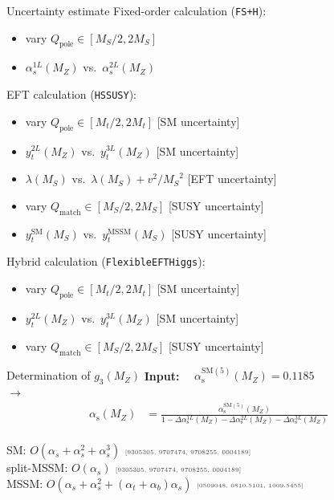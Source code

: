 \documentclass[hyperref={pdfpagelabels=false},ngerman]{beamer}
\newcommand{\MS}{\ensuremath{M_S}}
\newcommand{\mycite}[1]{\ensuremath{\text{\textcolor{darkgray}{\tiny [#1]}}}}
\renewcommand{\emph}{\textbf}
\newcommand{\SM}{\ensuremath{\text{SM}}}
\newcommand{\MSSM}{\ensuremath{\text{MSSM}}}
\newcommand{\pole}{\ensuremath{\text{pole}}}
\newcommand{\match}{\ensuremath{\text{match}}}
\newcommand{\at}{\alpha_t}
\newcommand{\ab}{\alpha_b}
\newcommand{\as}{\alpha_s}
\begin{document}
\begin{frame}[noframenumbering]{Uncertainty estimate}
  Fixed-order calculation (\texttt{FS+H}):
  \begin{itemize}
  \item vary $Q_\pole \in [\MS/2, 2\MS]$
  \item $\alpha^{1L}_s(M_Z)$ vs.\ $\alpha^{2L}_s(M_Z)$
  \end{itemize}
  EFT calculation (\texttt{HSSUSY}):
  \begin{itemize}
  \item vary $Q_\pole \in [M_t/2, 2 M_t]$ \hfill [SM uncertainty]
  \item $y_t^{2L}(M_Z)$ vs.\ $y_t^{3L}(M_Z)$ \hfill [SM uncertainty]
  \item $\lambda(\MS)$ vs.\ $\lambda(\MS) + v^2/\MS^2$ \hfill [EFT uncertainty]
  \item vary $Q_\match \in [\MS/2, 2 \MS]$ \hfill [SUSY uncertainty]
  \item $y_t^{\SM}(\MS)$ vs.\ $y_t^{\MSSM}(\MS)$ \hfill [SUSY uncertainty]
  \end{itemize}
  Hybrid calculation (\texttt{FlexibleEFTHiggs}):
  \begin{itemize}
  \item vary $Q_\pole \in [M_t/2, 2 M_t]$ \hfill [SM uncertainty]
  \item $y_t^{2L}(M_Z)$ vs.\ $y_t^{3L}(M_Z)$ \hfill [SM uncertainty]
  \item vary $Q_\match \in [\MS/2, 2 \MS]$ \hfill [SUSY uncertainty]
  \end{itemize}
\end{frame}

\begin{frame}[noframenumbering]{Determination of $g_3(M_Z)$}
  \emph{Input:} \ \ $\alpha_{\text{s}}^{\SM(5)}(M_Z) = 0.1185$\\[1em]
  $\rightarrow$
  \begin{align*}
    \alpha_{\text{s}}(M_Z) &=
    \frac{\alpha_{\text{s}}^{\SM(5)}(M_Z)}{1
      - \Delta\alpha_{\text{s}}^{1L}(M_Z)
      - \Delta\alpha_{\text{s}}^{2L}(M_Z)
      - \Delta\alpha_{\text{s}}^{3L}(M_Z)
    }
  \end{align*}
  \\\vspace{2em}
  SM: $O(\as + \as^2 + \as^3)$ \mycite{9305305, 9707474, 9708255, 0004189}\\
  split-MSSM: $O(\as)$ \mycite{9305305, 9707474, 9708255, 0004189}\\
  MSSM: $O(\as + \as^2 + (\at + \ab)\as)$ \mycite{0509048, 0810.5101, 1009.5455}
\end{frame}
\end{document}
